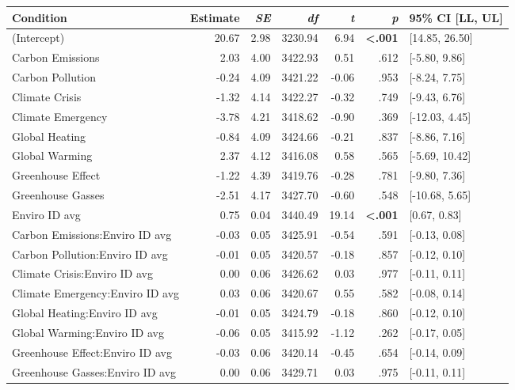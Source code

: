 \begin{table}[ht]
\centering
\begin{tabular}{lrrrrrl}
  \hline
Condition & Estimate & \textit{SE} & \textit{df} & \textit{t} & \textit{p} & 95\% CI [LL, UL] \\ 
  \hline
(Intercept) & 20.67 & 2.98 & 3230.94 & 6.94 & \textbf{\textless  .001} & [14.85, 26.50] \\ 
  Carbon Emissions & 2.03 & 4.00 & 3422.93 & 0.51 & .612 & [-5.80, 9.86] \\ 
  Carbon Pollution & -0.24 & 4.09 & 3421.22 & -0.06 & .953 & [-8.24, 7.75] \\ 
  Climate Crisis & -1.32 & 4.14 & 3422.27 & -0.32 & .749 & [-9.43, 6.76] \\ 
  Climate Emergency & -3.78 & 4.21 & 3418.62 & -0.90 & .369 & [-12.03, 4.45] \\ 
  Global Heating & -0.84 & 4.09 & 3424.66 & -0.21 & .837 & [-8.86, 7.16] \\ 
  Global Warming & 2.37 & 4.12 & 3416.08 & 0.58 & .565 & [-5.69, 10.42] \\ 
  Greenhouse Effect & -1.22 & 4.39 & 3419.76 & -0.28 & .781 & [-9.80, 7.36] \\ 
  Greenhouse Gasses & -2.51 & 4.17 & 3427.70 & -0.60 & .548 & [-10.68, 5.65] \\ 
  Enviro ID avg & 0.75 & 0.04 & 3440.49 & 19.14 & \textbf{\textless  .001} & [0.67, 0.83] \\ 
  Carbon Emissions:Enviro ID avg & -0.03 & 0.05 & 3425.91 & -0.54 & .591 & [-0.13, 0.08] \\ 
  Carbon Pollution:Enviro ID avg & -0.01 & 0.05 & 3420.57 & -0.18 & .857 & [-0.12, 0.10] \\ 
  Climate Crisis:Enviro ID avg & 0.00 & 0.06 & 3426.62 & 0.03 & .977 & [-0.11, 0.11] \\ 
  Climate Emergency:Enviro ID avg & 0.03 & 0.06 & 3420.67 & 0.55 & .582 & [-0.08, 0.14] \\ 
  Global Heating:Enviro ID avg & -0.01 & 0.05 & 3424.79 & -0.18 & .860 & [-0.12, 0.10] \\ 
  Global Warming:Enviro ID avg & -0.06 & 0.05 & 3415.92 & -1.12 & .262 & [-0.17, 0.05] \\ 
  Greenhouse Effect:Enviro ID avg & -0.03 & 0.06 & 3420.14 & -0.45 & .654 & [-0.14, 0.09] \\ 
  Greenhouse Gasses:Enviro ID avg & 0.00 & 0.06 & 3429.71 & 0.03 & .975 & [-0.11, 0.11] \\ 
   \hline
\end{tabular}
\end{table}
